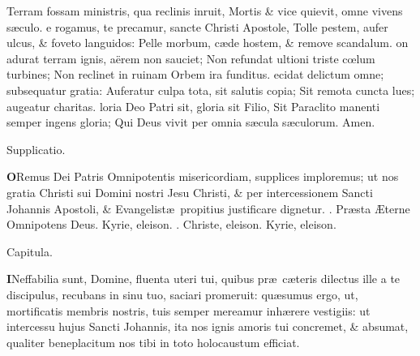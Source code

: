 \documentclass[letter,11pt]{book}
\makeatletter
\DeclareRobustCommand{\Rbar}{\vers@resp{0pt}{R}}
\newcommand{\vers@resp@sym}{\raisebox{0.2ex}{\rotatebox[origin=c]{-20}{$\m@th\rceil$}}}
\newcommand{\vers@resp}[2]{%
  {\ooalign{\hidewidth\kern#1\vers@resp@sym\hidewidth\cr#2\cr}}%
}%
\def\R{\color{Red} \Rbar . \color{black}}
\makeatother
\begin{document}
\begin{multicols*}{2}
\newline \indent Terram fossam ministris, qua reclinis inruit,
\newline \indent Mortis \& vice quievit, omne vivens s\ae culo.
e rogamus, te precamur, sancte Christi Apostole,
\newline \indent Tolle pestem, aufer ulcus, \& foveto languidos:
\newline \indent Pelle morbum, c\ae de hostem, \& remove scandalum.
on adurat terram ignis, aërem non sauciet;
\newline \indent Non refundat ultioni triste c\oe lum turbines;
\newline \indent Non reclinet in ruinam Orbem ira funditus.
ecidat delictum omne; subsequatur gratia:
\newline \indent Auferatur culpa tota, sit salutis copia;
\newline \indent Sit remota cuncta lues; augeatur charitas.
loria Deo Patri sit, gloria sit Filio,
\newline \indent Sit Paraclito manenti semper ingens gloria;
\newline \indent Qui Deus vivit per omnia s\ae cula s\ae culorum. Amen.
\vspace{-.5em} \begin{center} \color{Red} Supplicatio. \color{black} \end{center} \vspace{-.5em}
\lettrine[lines=2]{\bfseries \color{Red} O}{}Remus Dei Patris Omnipotentis misericordiam, supplices imploremus; ut nos gratia Christi sui Domini nostri Jesu Christi, \& per intercessionem Sancti Johannis Apostoli, \& Evangelist\ae \ propitius justificare dignetur. \R Pr\ae sta \AE terne Omnipotens Deus. Kyrie, eleison. \R Christe, eleison. Kyrie, eleison.
\vspace{-.5em} \begin{center} \color{Red} Capitula. \color{black} \end{center} \vspace{-.5em}
\lettrine[lines=2]{\bfseries \color{Red} I}{}Neffabilia sunt, Domine, fluenta uteri tui, quibus pr\ae \ c\ae teris dilectus ille a te discipulus, recubans in sinu tuo, saciari promeruit: qu\ae sumus ergo, ut, mortificatis membris nostris, tuis semper mereamur inh\ae rere vestigiis: ut intercessu hujus Sancti Johannis, ita nos ignis amoris tui concremet, \& absumat, qualiter beneplacitum nos tibi in toto holocaustum efficiat.

\end{multicols*}
\end{document}
